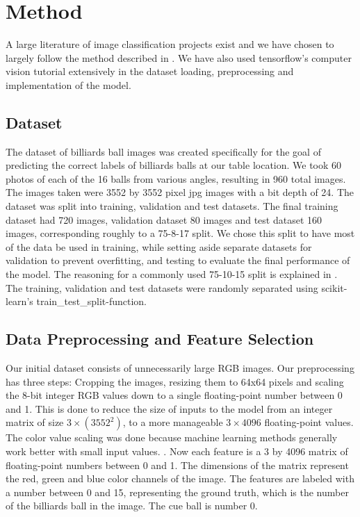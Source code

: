 \documentclass{article}
\begin{document}
\section{Method}
\label{sec:method}
A large literature of image classification projects exist and we have chosen to largely follow the method described in \cite{unknownMachineLearningApproach2023}.
We have also used tensorflow's computer vision tutorial extensively in the dataset loading, preprocessing and implementation of the model.\cite{ComputerVisionTensorFlow}

\subsection{Dataset}
\label{sec:dataset}
The dataset of billiards ball images was created specifically for the goal of predicting the correct labels of billiards balls at our table location.
We took 60 photos of each of the 16 balls from various angles, resulting in 960 total images. The images taken were 3552 by 3552 pixel jpg images 
with a bit depth of 24. The dataset was split into training, validation and test datasets. The final training dataset had 720 images, 
validation dataset 80 images and test dataset 160 images, corresponding roughly to a 75-8-17 split. We chose this split to have most of the data 
be used in training, while setting aside separate datasets for validation to prevent overfitting, and testing to evaluate the final 
performance of the model. The reasoning for a commonly used 75-10-15 split is explained in \cite{josephOptimalRatioData2022}. The training, 
validation and test datasets were randomly separated using scikit-learn's train\_test\_split-function.

\subsection{Data Preprocessing and Feature Selection}
\label{sec:data_preprocessing}
Our initial dataset consists of unnecessarily large RGB images. Our preprocessing has three steps: Cropping the images, resizing them to 64x64 pixels 
and scaling the 8-bit integer RGB values down to a single floating-point number between 0 and 1. This is done to reduce the size of inputs to the model 
from an integer matrix of size $3\times(3552^2)$, to a more manageable $3\times 4096$ floating-point values. The color value scaling was done because machine
learning methods generally work better with small input values. \cite{ImportanceFeatureScaling}. Now each feature is a 3 by 4096 matrix of floating-point
numbers between 0 and 1. The dimensions of the matrix represent the red, green and blue color channels of the image. The features are labeled with a number 
between 0 and 15, representing the ground truth, which is the number of the billiards ball in the image. The cue ball is number 0.
\end{document}
